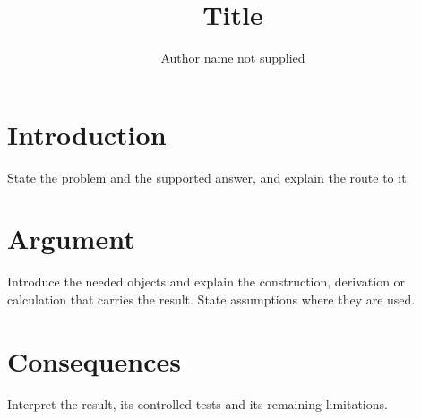 \documentclass[11pt,a4paper]{article}
\title{Title}
\author[a]{Author name not supplied}
\affiliation[a]{Affiliation not supplied}
\begin{document}
\maketitle
\flushbottom

\section{Introduction}
State the problem and the supported answer, and explain the route to it.

\section{Argument}
Introduce the needed objects and explain the construction, derivation or
calculation that carries the result. State assumptions where they are used.

\section{Consequences}
Interpret the result, its controlled tests and its remaining limitations.

% 
% 
\end{document}
